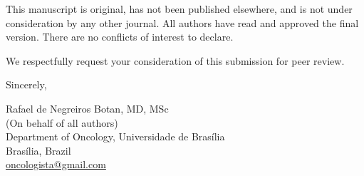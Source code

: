 \documentclass[11pt]{article}
\begin{document}
This manuscript is original, has not been published elsewhere, and is not under consideration by any other journal. All authors have read and approved the final version. There are no conflicts of interest to declare.

We respectfully request your consideration of this submission for peer review.

\bigskip

\noindent Sincerely,

\bigskip

\noindent Rafael de Negreiros Botan, MD, MSc\\
(On behalf of all authors)\\
Department of Oncology, Universidade de Bras\'{i}lia\\
Bras\'{i}lia, Brazil\\
\href{mailto:oncologista@gmail.com}{oncologista@gmail.com}
\end{document}
